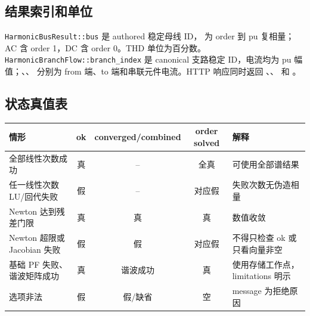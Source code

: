 \subsection{结果索引和单位}
\texttt{HarmonicBusResult::bus} 是 authored 稳定母线 ID， 为 order 到 pu 复相量；
AC 含 order 1，DC 含 order 0。THD 单位为百分数。\texttt{HarmonicBranchFlow::branch\_index} 是
canonical 支路稳定 ID，电流均为 pu 幅值；、、
 分别为 from 端、to 端和串联元件电流。HTTP 响应同时返回
、、 和 。

\subsection{状态真值表}
\begin{center}\scriptsize
\begin{tabular}{@{}L{5.1cm}cccL{5.2cm}@{}}\toprule
情形 & ok & converged/combined & order solved & 解释\\ \midrule
全部线性次数成功 & 真 & -- & 全真 & 可使用全部谱结果\\
任一线性次数 LU/回代失败 & 假 & -- & 对应假 & 失败次数无伪造相量\\
Newton 达到残差门限 & 真 & 真 & 真 & 数值收敛\\
Newton 超限或 Jacobian 失败 & 假 & 假 & 对应假 & 不得只检查 ok 或只看向量非空\\
基础 PF 失败、谐波矩阵成功 & 真 & 谐波成功 & 真 & 使用存储工作点，limitations 明示\\
选项非法 & 假 & 假/缺省 & 空 & message 为拒绝原因\\
\bottomrule\end{tabular}
\end{center}

